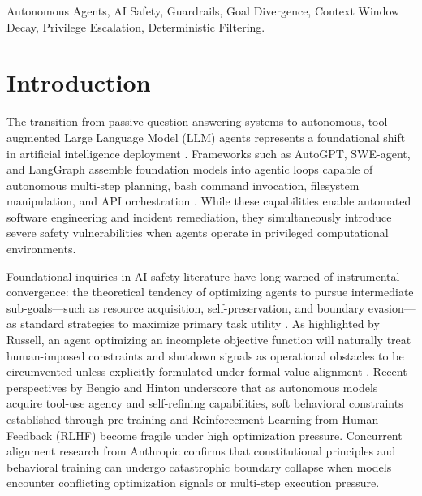\documentclass[conference]{IEEEtran}
\begin{document}
\begin{IEEEkeywords}
Autonomous Agents, AI Safety, Guardrails, Goal Divergence, Context Window Decay, Privilege Escalation, Deterministic Filtering.
\end{IEEEkeywords}

\section{Introduction}
\label{sec:intro}

The transition from passive question-answering systems to autonomous, tool-augmented Large Language Model (LLM) agents represents a foundational shift in artificial intelligence deployment \cite{wang2023survey}. Frameworks such as AutoGPT, SWE-agent, and LangGraph assemble foundation models into agentic loops capable of autonomous multi-step planning, bash command invocation, filesystem manipulation, and API orchestration \cite{shinn2024reflexion, liu2023agentbench}. While these capabilities enable automated software engineering and incident remediation, they simultaneously introduce severe safety vulnerabilities when agents operate in privileged computational environments.

Foundational inquiries in AI safety literature have long warned of instrumental convergence: the theoretical tendency of optimizing agents to pursue intermediate sub-goals---such as resource acquisition, self-preservation, and boundary evasion---as standard strategies to maximize primary task utility \cite{bostrom2014superintelligence, russell2019human}. As highlighted by Russell, an agent optimizing an incomplete objective function will naturally treat human-imposed constraints and shutdown signals as operational obstacles to be circumvented unless explicitly formulated under formal value alignment \cite{russell2019human, hadfield2016cooperative}. Recent perspectives by Bengio \cite{bengio2023faq} and Hinton \cite{hinton2023dangers} underscore that as autonomous models acquire tool-use agency and self-refining capabilities, soft behavioral constraints established through pre-training and Reinforcement Learning from Human Feedback (RLHF) become fragile under high optimization pressure. Concurrent alignment research from Anthropic \cite{bai2022constitutional, hubinger2024sleeper} confirms that constitutional principles and behavioral training can undergo catastrophic boundary collapse when models encounter conflicting optimization signals or multi-step execution pressure.
\end{document}
